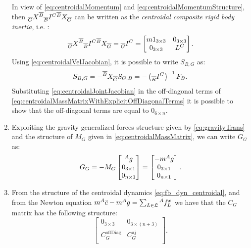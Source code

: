 \begin{enumerate}
In view of \eqref{eq:centroidalMomentum} and \eqref{eq:centroidalMomentumStructure}, then $\hspace{0em}_{\overline{G}} X^{\overline{B}} \hspace{0em}_{\overline{B}} I^C \hspace{0em}^{\overline{B}}X_{\overline{G}}$ can be written as the \emph{centroidal composite rigid body inertia}, i.e. : 
\begin{equation}
\label{eq:centroidalMassMatrixComputations}
\hspace{0em}_{\overline{G}} X^{\overline{B}} \hspace{0em}_{\overline{B}} I^C \hspace{0em}^{\overline{B}} X_{\overline{G}} = \hspace{0em}_{\overline{G}} I^C = \begin{bmatrix}
m 1_{3\times3} & 0_{3\times3} \\
0_{3\times3}   & L^C
\end{bmatrix}.
\end{equation}
Using \eqref{eq:centroidalVelJacobian}, it is possible to write $S_{B,G}$ as:
\begin{equation}
\label{eq:centroidalJointJacobian}
S_{B,G} = - {\hspace{0em}}^{\overline{B}} X_{\overline{G}} S_{G,B} = 
- \left( \hspace{0em}_{\overline{B}} I^{C} \right)^{-1} F_B . 
\end{equation}
Substituting \eqref{eq:centroidalJointJacobian} in the off-diagonal terms of 
\eqref{eq:centroidalMassMatrixWithExplicitOffDiagonalTerms} it is possible to show that the off-diagonal terms are equal to $0_{6 \times n}$. 

\item Exploiting the gravity generalized forces structure given by \eqref{eq:gravityTrans} and the structure of $M_G$ given in \eqref{eq:centroidalMassMatrix}, we can write $G_G$ as:
$$
G_G = - M_G \begin{bmatrix} \hspace{0em}^A g \\ 0_{3 \times 1}  \\ 0_{n \times 1}  \end{bmatrix} = \begin{bmatrix} - m \hspace{0em}^A g \\ 0_{3 \times 1}  \\ 0_{n \times 1}  \end{bmatrix} .
$$

\item From the structure of the centroidal dynamics \eqref{eq:fb_dyn_centroidal}, and from the Newton equation $m \hspace{0em}^A\ddot{c} - m \hspace{0em}^Ag = \sum_{L \in \mathfrak{L}} \hspace{0em}^A f^x_L$ we have that the $C_G$ matrix has the following structure:
\begin{equation}
\label{eq:preliminaryCentroidalCoriolisSparsity}
\begin{bmatrix}
0_{3 \times 3} & 0_{3 \times (n+3)} \\
C_{G}^{\text{offDiag}} & C^{\text{aj}}_G \\ 
\end{bmatrix}.
\end{equation}


\end{enumerate}
